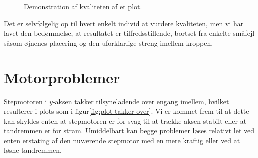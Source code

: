\begin{figure}[htbp]
  \centering
  \qquad
  \caption{Demonstration af kvaliteten af et plot.}
  \label{fig:plot-tux}
\end{figure}

Det er selvfølgelig op til hvert enkelt individ at vurdere kvaliteten,
men vi har lavet den bedømmelse, at resultatet er tilfredsstillende,
bortset fra enkelte småfejl såsom øjnenes placering og den
uforklarlige streng imellem kroppen.


\section{Motorproblemer}

Stepmotoren i $y$-aksen takker tilsyneladende over engang imellem,
hvilket resulterer i plots som i figur\vref{fig:plot-takker-over}.
Vi er kommet frem til at dette kan skyldes enten at stepmotoren er
for svag til at trække aksen stabilt eller at tandremmen er for stram.
Umiddelbart kan begge problemer løses relativt let ved enten erstating
af den nuværende stepmotor med en mere kraftig eller ved at løsne tandremmen.

